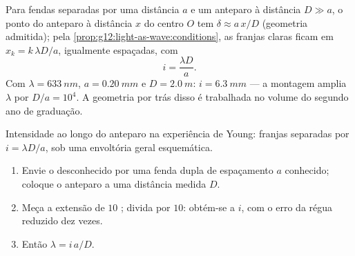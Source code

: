 \begin{proposition}[A interfranja]\label{prop:g12:light-as-wave:interfringe}
Para fendas separadas por uma distância $a$ e um anteparo à distância
$D \gg a$, o ponto do anteparo à distância $x$ do centro $O$ tem
 $\delta \approx a\,x/D$ (geometria admitida); pela
\cref{prop:g12:light-as-wave:conditions}, as franjas claras ficam em
$x_k = k\,\lambda D/a$, igualmente espaçadas, com 
\[
i = \frac{\lambda D}{a}.
\]
Com $\lambda = \qty{633}{nm}$, $a = \qty{0.20}{mm}$ e
$D = \qty{2.0}{m}$: $i = \qty{6.3}{mm}$ --- a montagem amplia $\lambda$
por $D/a = 10^4$. A geometria por trás disso é trabalhada no volume do
segundo ano de graduação.
\end{proposition}
\admitted

\begin{omfigure}

{\small Intensidade ao longo do anteparo na experiência de Young: franjas
separadas por $i = \lambda D/a$, sob uma envoltória geral esquemática.}
\end{omfigure}

\begin{method}\label{met:g12:light-as-wave:lambda}
\begin{enumerate}
  \item Envie o  desconhecido por uma fenda dupla de espaçamento $a$
        conhecido; coloque o anteparo a uma distância medida $D$.
  \item Meça a extensão de $10$ ; divida por $10$: obtém-se a
         $i$, com o erro da régua reduzido dez vezes.
  \item Então $\lambda = i\,a/D$.
\end{enumerate}
\end{method}

